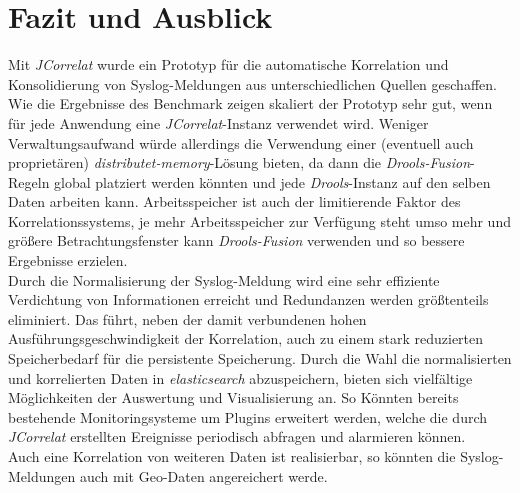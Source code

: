 \chapter{Fazit und Ausblick}
\thispagestyle{fancy}

Mit \textit{JCorrelat} wurde ein Prototyp für die automatische Korrelation und 
Konsolidierung von Syslog-Meldungen aus unterschiedlichen Quellen geschaffen. Wie die 
Ergebnisse des Benchmark zeigen skaliert der Prototyp sehr gut, wenn für jede Anwendung 
eine \textit{JCorrelat}-Instanz verwendet wird. Weniger Verwaltungsaufwand würde 
allerdings die Verwendung einer (eventuell auch proprietären) 
\textit{distributet-memory}-Lösung bieten, da dann die \textit{Drools-Fusion}-Regeln 
global platziert werden könnten und jede \textit{Drools}-Instanz auf den selben Daten 
arbeiten kann. Arbeitsspeicher ist auch der limitierende Faktor des Korrelationssystems, 
je mehr Arbeitsspeicher zur Verfügung steht umso mehr und größere Betrachtungsfenster 
kann \textit{Drools-Fusion} verwenden und so bessere Ergebnisse erzielen.\\

Durch die Normalisierung der Syslog-Meldung wird eine sehr effiziente Verdichtung von 
Informationen erreicht und Redundanzen werden größtenteils eliminiert. Das führt, neben 
der damit verbundenen hohen Ausführungsgeschwindigkeit der Korrelation, auch zu einem 
stark reduzierten Speicherbedarf für die persistente Speicherung. Durch die Wahl die 
normalisierten und korrelierten Daten in \textit{elasticsearch} abzuspeichern, bieten 
sich vielfältige Möglichkeiten der Auswertung und Visualisierung an. So Könnten bereits 
bestehende Monitoringsysteme um Plugins erweitert werden, welche die durch 
\textit{JCorrelat} erstellten Ereignisse periodisch abfragen und alarmieren können.\\

Auch eine Korrelation von weiteren Daten ist realisierbar, so könnten die 
Syslog-Meldungen auch mit Geo-Daten angereichert werde. 